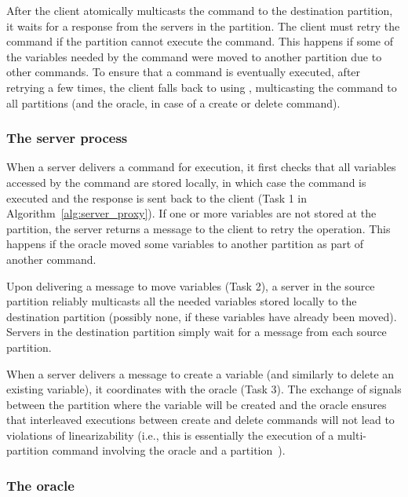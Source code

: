 After the client atomically multicasts the command to the destination partition, it waits for a response from the servers in the partition.
The client must retry the command if the partition cannot execute the command.
This happens if some of the variables needed by the command were moved to another partition due to other commands. 
To ensure that a command is eventually executed, after retrying a few times, the client falls back to using \ssmr{}, multicasting the command to all partitions (and the oracle, in case of a create or delete command).

\subsubsection{The server process} 

When a server delivers a command for execution, it first checks that all variables accessed by the command are stored locally, in which case the command is executed and the response is sent back to the client (Task 1 in Algorithm~\ref{alg:server_proxy}).
If one or more variables are not stored at the partition, the server returns a message to the client to retry the operation.
This happens if the oracle moved some variables to another partition as part of another command. 

Upon delivering a message to move variables (Task 2), a server in the source partition reliably multicasts all the needed variables stored locally to the destination partition (possibly none, if these variables have already been moved).
Servers in the destination partition simply wait for a message from each source partition.

When a server delivers a message to create a variable (and similarly to delete an existing variable), it coordinates with the oracle (Task 3).
The exchange of signals between the partition where the variable will be created and the oracle ensures that interleaved executions between create and delete commands will not lead to violations of linearizability (i.e., this is essentially the execution of a multi-partition command involving the oracle and a partition~\cite{bezerra2014ssmr}).

\subsubsection{The oracle} 

